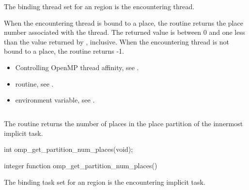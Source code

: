 \binding
The binding thread set for an  region is the encountering thread.

\effect
When the encountering thread is bound to a place, the 
 routine returns the place number associated 
with the thread. The returned value is between 0 and one less than the 
value returned by , inclusive. When the 
encountering thread is not bound to a place, the routine returns -1.

\crossreferences
\begin{itemize}
\item Controlling OpenMP thread affinity, see 
. 

\item {} routine, see 
.

\item {} environment variable, see 
.
\end{itemize}





\subsection{}
\label{subsec:omp_get_partition_num_places}

\summary
The  routine returns the number of places in the place partition 
of the innermost implicit task.

\format
\begin{ccppspecific}
\begin{boxedcode}
int omp\_get\_partition\_num\_places(void);
\end{boxedcode}
\end{ccppspecific}

\begin{fortranspecific}
\begin{boxedcode}
integer function omp\_get\_partition\_num\_places()
\end{boxedcode}
\end{fortranspecific}

\binding
The binding task set for an   region is the encountering implicit task.

